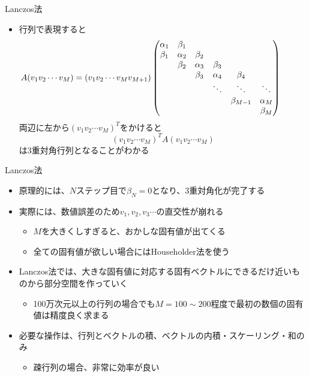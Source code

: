 \documentclass[dvipdfmx]{beamer}
\begin{document}
\begin{frame}[t,fragile]{Lanczos法}
  \begin{itemize}
    \setlength{\itemsep}{1em}
  \item 行列で表現すると
    \begin{align*}
      \hspace*{-2em}
      A
      (v_1v_2\cdots v_M)
      &=
      (v_1v_2\cdots v_M v_{M+1})
      \begin{pmatrix}
        \alpha_1 & \beta_1\\
        \beta_1 & \alpha_2 & \beta_2 \\
        & \beta_2 & \alpha_3 & \beta_3 \\
        & & \beta_3 & \alpha_4 & \beta_4 \\
        & & & \ddots & \ddots & \ddots \\
        & & & & \beta_{M-1} & \alpha_M \\
        & & & & & \beta_M \\
      \end{pmatrix}
    \end{align*}
    両辺に左から$(v_1v_2\cdots v_M)^T$をかけると
    \[
    (v_1v_2\cdots v_M)^T A (v_1v_2\cdots v_M)
    \]
    は3重対角行列となることがわかる
  \end{itemize}
\end{frame}

\begin{frame}[t,fragile]{Lanczos法}
  \begin{itemize}
  \item 原理的には、$N$ステップ目で$\beta_N=0$となり、3重対角化が完了する
  \item 実際には、数値誤差のため$v_1,v_2,v_3\cdots$の直交性が崩れる
    \begin{itemize}
      \item $M$を大きくしすぎると、おかしな固有値が出てくる
      \item 全ての固有値が欲しい場合にはHouseholder法を使う
    \end{itemize}
  \item Lanczos法では、大きな固有値に対応する固有ベクトルにできるだけ近いものから部分空間を作っていく
    \begin{itemize}
      \item 100万次元以上の行列の場合でも$M=100 \sim 200$程度で最初の数個の固有値は精度良く求まる
    \end{itemize}
  \item 必要な操作は、行列とベクトルの積、ベクトルの内積・スケーリング・和のみ
    \begin{itemize}
      \item 疎行列の場合、非常に効率が良い
    \end{itemize}
  \end{itemize}
\end{frame}
\end{document}
